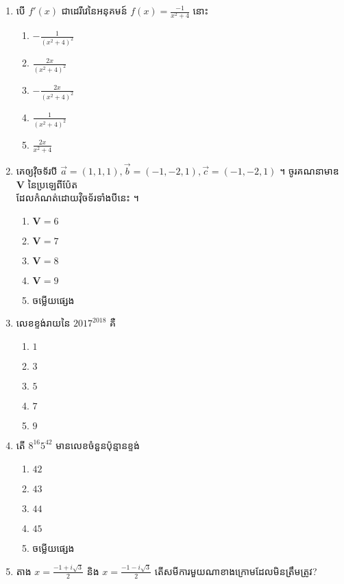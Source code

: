 \documentclass[12pt, a4paper]{article}
\begin{document}
\begin{enumerate}[m]
	\item បើ $f'(x)$ ជាដេរីវេនៃអនុគមន៍ $f(x)=\frac{-1}{x^2+4}$ នោះ
	\begin{enumerate}[k,5]
		\item $-\frac{1}{\left(x^2+4\right)^2}$
		\item $\frac{2x}{\left(x^2+4\right)^2}$
		\item $-\frac{2x}{\left(x^2+4\right)^2}$
		\item $\frac{1}{\left(x^2+4\right)^2}$
		\item $\frac{2x}{x^2+4}$
	\end{enumerate}
	{\color{blue}\hrulefill}
	\item គេឲ្យវ៉ិចទ័របី $\vec{a}=(1,1,1), \vec{b}=(-1,-2,1), \vec{c}=(-1,-2,1)$ ។ ចូរគណនាមាឌ $\mathbf{V}$ នៃប្រឡេពីប៉ែត\\ ដែលកំណត់ដោយវ៉ិចទ័រទាំងបីនេះ ។
	\begin{enumerate}[k,5]
		\item $\mathbf{V}=6$
		\item $\mathbf{V}=7$
		\item $\mathbf{V}=8$
		\item $\mathbf{V}=9$
		\item ចម្លើយផ្សេង
	\end{enumerate}
	{\color{blue}\hrulefill}
	\item លេខខ្ទង់រាយនៃ $2017^{2018}$ គឺ
	\begin{enumerate}[k,5]
		\item $1$
		\item $3$
		\item $5$
		\item $7$
		\item $9$
	\end{enumerate}
	{\color{blue}\hrulefill}
	\item តើ $8^{16}5^{42}$ មានលេខចំនួនប៉ុន្មានខ្ទង់ 
	\begin{enumerate}[k,5]
		\item $42$
		\item $43$
		\item $44$
		\item $45$
		\item ចម្លើយផ្សេង
	\end{enumerate}
	{\color{blue}\hrulefill}
	\item តាង $x=\frac{-1+i\sqrt{3}}{2}$ និង $x=\frac{-1-i\sqrt{3}}{2}$ តើសមីការមួយណាខាងក្រោមដែលមិនត្រឹមត្រូវ?
	\begin{enumerate}[k,3]

\end{enumerate}
\end{enumerate}
\end{document}
